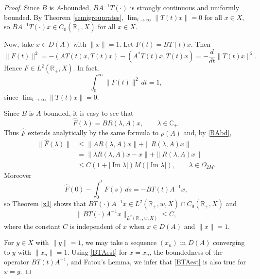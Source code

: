 \documentclass[11pt]{amsart}
\theoremstyle{definition}
\theoremstyle{remark}
\numberwithin{equation}{section}
\begin{document}
\begin{proof}  Since $B$ is $A$-bounded, $BA^{-1}T(\cdot)$ is strongly continuous and uniformly bounded.  By Theorem \ref{semigrouprates}, $\lim_{t\to\infty} \|T(t)x\| = 0$ for all $x \in X$, so $BA^{-1}T(\cdot)x \in C_0({{\mathbb R}}_+,X)$ for all $x \in X$.

Now, take $x \in D(A)$ with $\|x\|=1$.
Let $F(t) = BT(t)x$.  Then
\[
\|F(t)\|^2 = - ( AT(t)x, T(t)x ) - (A^*T(t)x, T(t)x ) = - \frac{d}{dt} \|T(t)x\|^2.
\]
Hence $F \in L^2({{\mathbb R}}_+, X)$. In fact,
\[
\int_0^\infty \|F(t)\|^2 \, dt = 1,
\]
since $\lim_{t\to\infty} \|T(t)x\| = 0$.

Since $B$ is $A$-bounded, it is easy to see that
\[
\widehat F(\lambda) = B R(\lambda,A)x, \qquad \lambda \in {{\mathbb C}}_+.
\]
Thus $\widehat F$ extends analytically by the same formula to $\rho(A)$ and, by \eqref{BAbd},
\begin{align*}
\|\widehat F(\lambda)\| &\le \|AR(\lambda,A)x\| + \|R(\lambda,A)x\| \\
&= \|\lambda R(\lambda,A)x - x\|+ \|R(\lambda,A)x\| \\
&\le C (1 + |{\operatorname{Im}}\lambda|) M(|{\operatorname{Im}}\lambda|), \qquad \lambda \in \Omega_{2M}.
\end{align*}
Moreover
\[
\widehat F(0) - \int_0^t F(s) \, ds = - BT(t) A^{-1} x,
\]
so Theorem \ref{x1} shows that $BT(\cdot)A^{-1}x \in L^2({{\mathbb R}}_+,w,X) \cap C_0({{\mathbb R}}_+,X)$ and
\begin{equation} \label{BTAest}
\|BT(\cdot) A^{-1}x\|_{L^2({{\mathbb R}}_+,w,X)} \le C,
\end{equation}
where the constant $C$ is independent of $x$ when $x \in D(A)$ and $\|x\|=1$.

For $y \in X$ with $\|y\|=1$, we may take a sequence $(x_n)$ in $D(A)$ converging to $y$ with $\|x_n\|=1$.  Using \eqref{BTAest} for $x= x_n$, the boundedness of the operator $BT(t)A^{-1}$, and Fatou's Lemma, we infer that \eqref{BTAest} is also true for $x=y$.  
\end{proof}
\end{document}
